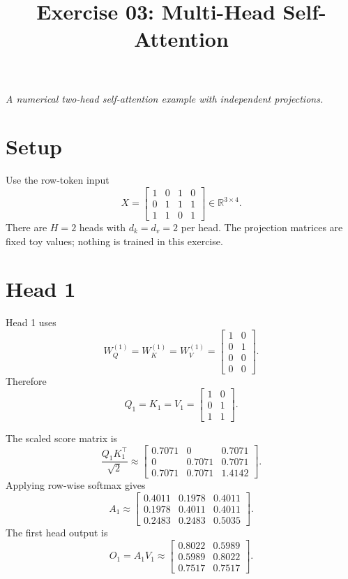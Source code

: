 \documentclass[11pt]{article}
\title{\textbf{Exercise 03: Multi-Head Self-Attention}}
\author{}
\date{}
\begin{document}
\maketitle

\begin{center}
\emph{A numerical two-head self-attention example with independent projections.}
\end{center}

\section*{Setup}

Use the row-token input
\[
X=
\begin{bmatrix}
1&0&1&0\\
0&1&1&1\\
1&1&0&1
\end{bmatrix}
\in\mathbb{R}^{3\times4}.
\]
There are $H=2$ heads with $d_k=d_v=2$ per head. The projection matrices are fixed toy values; nothing is trained in this exercise.

\section*{Head 1}

Head 1 uses
\[
W_Q^{(1)}=W_K^{(1)}=W_V^{(1)}=
\begin{bmatrix}
1&0\\
0&1\\
0&0\\
0&0
\end{bmatrix}.
\]
Therefore
\[
Q_1=K_1=V_1=
\begin{bmatrix}
1&0\\
0&1\\
1&1
\end{bmatrix}.
\]

The scaled score matrix is
\[
\frac{Q_1K_1^\top}{\sqrt{2}}
\approx
\begin{bmatrix}
0.7071&0&0.7071\\
0&0.7071&0.7071\\
0.7071&0.7071&1.4142
\end{bmatrix}.
\]
Applying row-wise softmax gives
\[
A_1\approx
\begin{bmatrix}
0.4011&0.1978&0.4011\\
0.1978&0.4011&0.4011\\
0.2483&0.2483&0.5035
\end{bmatrix}.
\]
The first head output is
\[
O_1=A_1V_1
\approx
\begin{bmatrix}
0.8022&0.5989\\
0.5989&0.8022\\
0.7517&0.7517
\end{bmatrix}.
\]
\end{document}
